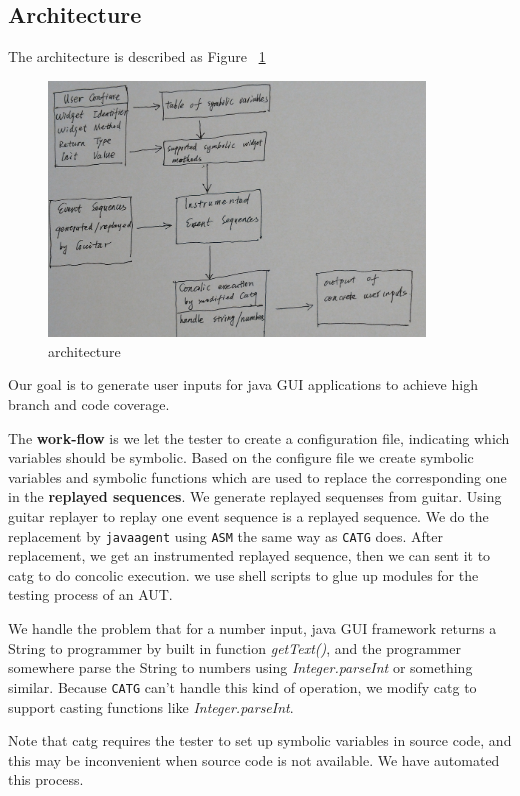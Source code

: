 \documentclass[blind]{sig-alternate-05-2015}
\begin{document}
\subsection{Architecture}

The architecture is described as Figure ~\ref{figure:architecture}

\begin{figure}
  \centering
  \includegraphics[width=100mm,scale=0.5]{./res/archi-hand.jpg}
  \caption{architecture}
  \label{figure:architecture}
\end{figure}

Our goal is to generate user inputs for java GUI applications to achieve high branch and code coverage.

The \textbf{work-flow} is  we let the tester to create a configuration file, indicating which variables should be symbolic.
Based on the configure file we create symbolic variables and symbolic functions which are used to replace the corresponding one in the \textbf{replayed sequences}. We generate replayed sequenses from guitar. Using guitar replayer to replay one event sequence is a replayed sequence. We do the replacement by \texttt{javaagent} using \texttt{ASM} the same way as \texttt{CATG} does. After replacement, we get an instrumented replayed sequence, then we can sent it to catg to do concolic execution. we use shell scripts to glue up modules for the testing process of an AUT.

We handle the problem that for a number input, java GUI framework returns a String to programmer by built in function \textit{getText()}, and the programmer somewhere parse the String to numbers using \textit{Integer.parseInt} or something similar.  Because \texttt{CATG} can't handle this kind of operation, we modify catg to support casting functions like \textit{Integer.parseInt}.

Note that catg requires the tester to set up symbolic variables in source code, and this may be inconvenient when source code is not available. We have automated this process.
\end{document}
